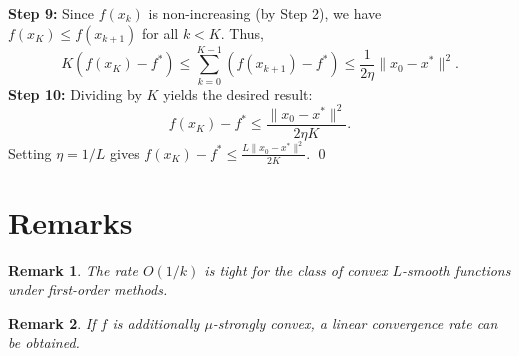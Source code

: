 \documentclass{article}
\newtheorem{remark}{Remark}
\begin{document}
\textbf{Step 9:} Since $f(x_k)$ is non-increasing (by Step 2), we have $f(x_K) \le f(x_{k+1})$ for all $k < K$. Thus,
\begin{equation}
    K (f(x_K) - f^*) \le \sum_{k=0}^{K-1} (f(x_{k+1}) - f^*) \le \frac{1}{2\eta} \|x_0 - x^*\|^2.
\end{equation}
\textbf{Step 10:} Dividing by $K$ yields the desired result:
\begin{equation}
    f(x_K) - f^* \le \frac{\|x_0 - x^*\|^2}{2\eta K}.
\end{equation}
Setting $\eta = 1/L$ gives $f(x_K) - f^* \le \frac{L \|x_0 - x^*\|^2}{2K}$. \qed

\section{Remarks}

\begin{remark}
    The rate $O(1/k)$ is tight for the class of convex $L$-smooth functions under first-order methods.
\end{remark}

\begin{remark}
    If $f$ is additionally $\mu$-strongly convex, a linear convergence rate can be obtained.
\end{remark}

\end{document}
